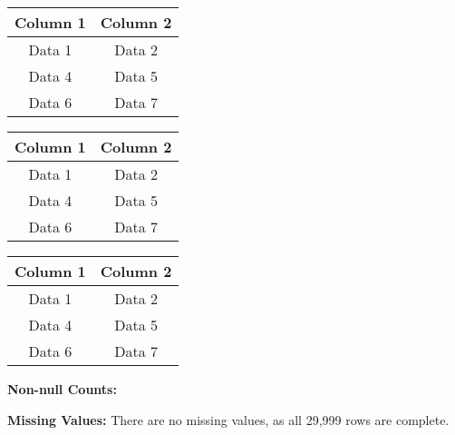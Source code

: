 \documentclass[12pt]{article}
\begin{document}
\begin{center}
\begin{tabular}{||c|c||}
\hline
\hline
\rowcolor[HTML]{89A8B2} Column 1 & Column 2 \\
\hline
\hline
\rowcolor[HTML]{F8FAFC} Data 1 & Data 2 \\ %
\hline

\rowcolor[HTML]{D8EFD3} Data 4 & Data 5 \\
\hline

\rowcolor[HTML]{F8FAFC} Data 6 & Data 7 \\ %
\hline
\hline
\end{tabular}
\end{center}
\bigskip %

\begin{center}
\begin{tabular}{||c|c||}
\hline
\hline
\rowcolor[HTML]{89A8B2} Column 1 & Column 2 \\
\hline
\hline
\rowcolor[HTML]{F8FAFC} Data 1 & Data 2 \\ %
\hline

\rowcolor[HTML]{D8EFD3} Data 4 & Data 5 \\
\hline

\rowcolor[HTML]{F8FAFC} Data 6 & Data 7 \\ %
\hline
\hline
\end{tabular}
\end{center}
\bigskip %
\begin{center}
\begin{tabular}{||c|c||}
\hline
\hline
\rowcolor[HTML]{89A8B2} Column 1 & Column 2 \\
\hline
\hline
\rowcolor[HTML]{F8FAFC} Data 1 & Data 2 \\ %
\hline

\rowcolor[HTML]{D8EFD3} Data 4 & Data 5 \\
\hline

\rowcolor[HTML]{F8FAFC} Data 6 & Data 7 \\ %
\hline
\hline
\end{tabular}
\end{center}
\bigskip %


\textbf{Non-null Counts: }

\textbf{Missing Values: }There are no missing values, as all 29,999 rows are complete.
\vspace{5pt}
\end{document}
